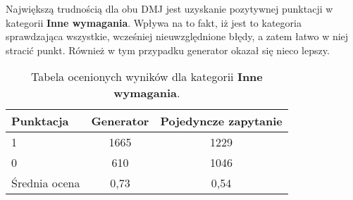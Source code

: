 Największą trudnością dla obu DMJ jest uzyskanie pozytywnej punktacji w kategorii \textbf{Inne wymagania}. Wpływa na to fakt, iż jest to kategoria sprawdzająca wszystkie, wcześniej nieuwzględnione błędy, a zatem łatwo w niej stracić punkt. Również w tym przypadku generator okazał się nieco lepszy.

\begin{table}[ht]
\caption{Tabela ocenionych wyników dla kategorii \textbf{Inne wymagania}.}\label{tab:tabela15}
\centering%
\begin{tabular}{|l|c|c|}
\hline
\textbf{Punktacja} & \textbf{Generator} & \textbf{Pojedyncze zapytanie}\\
\hline
1 & 1665 & 1229 \\
\hline
0 & 610 & 1046 \\
\hline
Średnia ocena & 0,73 & 0,54 \\
\hline
\end{tabular}
\end{table}



